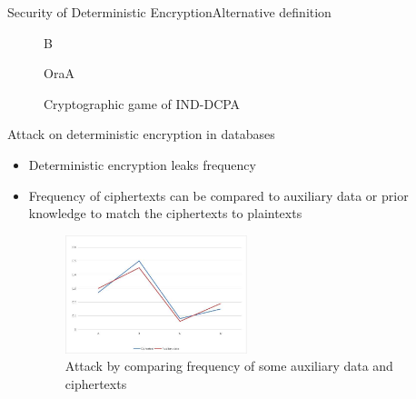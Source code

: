 \documentclass{beamer}
\begin{document}
\begin{frame}{Security of Deterministic Encryption}{Alternative definition}
\begin{figure}[H]
	\begin{center}
		\begin{bbrenv}{B}
			\begin{bbrbox}[name=Adversary, minheight=3.5cm, minwidth=2.5cm]
			\end{bbrbox}
			
			\bbrmsgspace{1cm}
			\bbrmsgspace{1cm}
			
			\begin{bbroracle}{OraA}
				\begin{bbrbox}[name={Encryption}, minheight=1cm]
				\end{bbrbox}
			\end{bbroracle}
			
		\end{bbrenv}
	\end{center}
	
	\caption{Cryptographic game of IND-DCPA}
\end{figure}
\end{frame}


\begin{frame}{Attack on deterministic encryption in databases}
\begin{itemize}
\item Deterministic encryption leaks frequency
\item Frequency of ciphertexts can be compared to auxiliary data or prior knowledge to match the ciphertexts to plaintexts
\begin{figure}
	\includegraphics[width=0.5\textwidth]{./attack.jpg}
	\caption{Attack by comparing frequency of some auxiliary data and ciphertexts}
\end{figure}
\end{itemize}
\end{frame}
\end{document}
